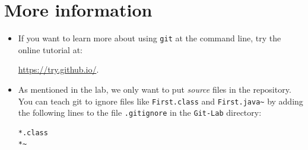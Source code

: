 \documentclass[11pt]{article}
\begin{document}
\section*{More information}

\begin{itemize}
\item If you want to learn more about using {\tt git} at the command line, try the online tutorial at:

\url{https://try.github.io/}.

\item As mentioned in the lab, we only want to put {\em source} files in the repository.  You can teach git to ignore files like {\tt First.class} and {\tt First.java\textasciitilde} by adding the following lines to the file {\tt .gitignore} in the {\tt Git-Lab} directory:

\begin{verbatim}
*.class
*~
\end{verbatim}

\end{itemize}
\end{document}
